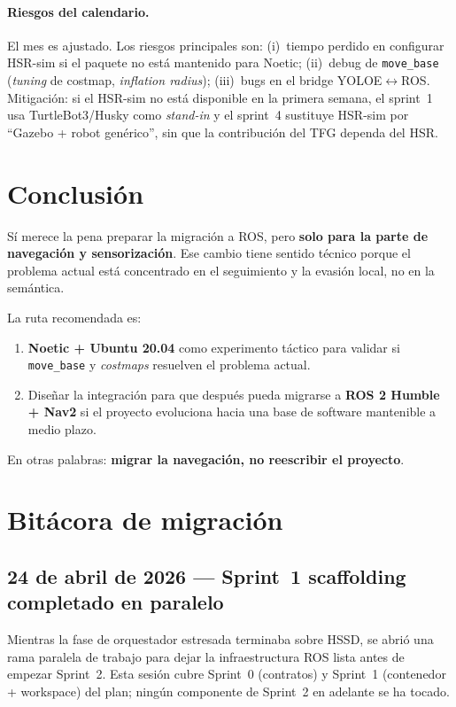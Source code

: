 \documentclass[11pt,a4paper]{article}
\begin{document}
\paragraph{Riesgos del calendario.} El mes es ajustado. Los riesgos principales
son: (i)~tiempo perdido en configurar HSR-sim si el paquete no está mantenido
para Noetic; (ii)~debug de \texttt{move\_base} (\textit{tuning} de costmap,
\textit{inflation radius}); (iii)~bugs en el bridge YOLOE$\leftrightarrow$ROS.
Mitigación: si el HSR-sim no está disponible en la primera semana, el sprint~1
usa TurtleBot3/Husky como \emph{stand-in} y el sprint~4 sustituye HSR-sim por
``Gazebo + robot genérico'', sin que la contribución del TFG dependa del HSR.

\section{Conclusión}

Sí merece la pena preparar la migración a ROS, pero \textbf{solo para la parte
de navegación y sensorización}. Ese cambio tiene sentido técnico porque el
problema actual está concentrado en el seguimiento y la evasión local, no en la
semántica.

La ruta recomendada es:

\begin{enumerate}
  \item \textbf{Noetic + Ubuntu 20.04} como experimento táctico para validar si
        \texttt{move\_base} y \textit{costmaps} resuelven el problema actual.
  \item Diseñar la integración para que después pueda migrarse a
        \textbf{ROS 2 Humble + Nav2} si el proyecto evoluciona hacia una base
        de software mantenible a medio plazo.
\end{enumerate}

En otras palabras: \textbf{migrar la navegación, no reescribir el proyecto}.

\section{Bitácora de migración}

\subsection*{24 de abril de 2026 --- Sprint~1 scaffolding completado en paralelo}

Mientras la fase de orquestador estresada terminaba sobre HSSD, se
abrió una rama paralela de trabajo para dejar la infraestructura ROS
lista antes de empezar Sprint~2. Esta sesión cubre Sprint~0 (contratos)
y Sprint~1 (contenedor + workspace) del plan; ningún componente de
Sprint~2 en adelante se ha tocado.
\end{document}
